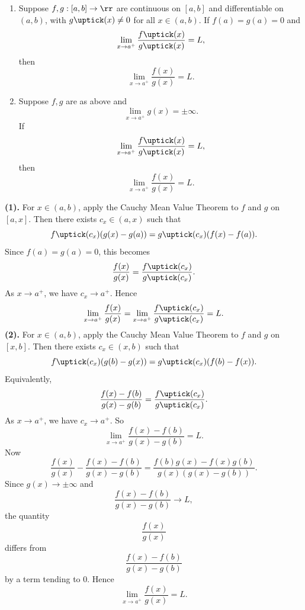 \begin{theorem}{
    \begin{enumerate}
        \item Suppose $f,g : [a,b]\to\rr$ are continuous on $[a,b]$ and differentiable on $(a,b)$, with $g\uptick(x)\neq 0$ for all $x\in(a,b)$.
        If $f(a) = g(a) = 0$ and
        \[
            \lim_{x\to a^+}\dfrac{f\uptick(x)}{g\uptick(x)} = L,
        \]
        then
        \[
            \lim_{x\to a^+}\dfrac{f(x)}{g(x)} = L.
        \]
        \item Suppose $f,g$ are as above and
        \[
            \lim_{x\to a^+} g(x) = \pm\infty.
        \]
        If
        \[
            \lim_{x\to a^+}\dfrac{f\uptick(x)}{g\uptick(x)} = L,
        \]
        then
        \[
            \lim_{x\to a^+}\dfrac{f(x)}{g(x)} = L.
        \]
    \end{enumerate}
}
	\textbf{(1).}
    For $x\in(a,b)$, apply the Cauchy Mean Value Theorem to $f$ and $g$ on $[a,x]$.
    Then there exists $c_x\in(a,x)$ such that
    \[
        f\uptick(c_x)(g(x)-g(a)) = g\uptick(c_x)(f(x)-f(a)).
    \]
    Since $f(a)=g(a)=0$, this becomes
    \[
        \dfrac{f(x)}{g(x)} = \dfrac{f\uptick(c_x)}{g\uptick(c_x)}.
    \]
    As $x\to a^+$, we have $c_x\to a^+$.
    Hence
    \[
        \lim_{x\to a^+}\dfrac{f(x)}{g(x)}
        =
        \lim_{x\to a^+}\dfrac{f\uptick(c_x)}{g\uptick(c_x)}
        =
        L.
    \]
    \textbf{(2).}
    For $x\in(a,b)$, apply the Cauchy Mean Value Theorem to $f$ and $g$ on $[x,b]$.
    Then there exists $c_x\in(x,b)$ such that
    \[
        f\uptick(c_x)(g(b)-g(x)) = g\uptick(c_x)(f(b)-f(x)).
    \]
    Equivalently,
    \[
        \dfrac{f(x)-f(b)}{g(x)-g(b)} = \dfrac{f\uptick(c_x)}{g\uptick(c_x)}.
    \]
    As $x\to a^+$, we have $c_x\to a^+$.
    So
    \[
        \lim_{x\to a^+}\dfrac{f(x)-f(b)}{g(x)-g(b)} = L.
    \]
    Now
    \[
        \dfrac{f(x)}{g(x)} - \dfrac{f(x)-f(b)}{g(x)-g(b)}
        =
        \dfrac{f(b)g(x) - f(x)g(b)}{g(x)(g(x)-g(b))}.
    \]
    Since $g(x)\to \pm\infty$ and
    \[
        \dfrac{f(x)-f(b)}{g(x)-g(b)} \to L,
    \]
    the quantity
    \[
        \dfrac{f(x)}{g(x)}
    \]
    differs from
    \[
        \dfrac{f(x)-f(b)}{g(x)-g(b)}
    \]
    by a term tending to $0$.
    Hence
    \[
        \lim_{x\to a^+}\dfrac{f(x)}{g(x)} = L.
    \]
\end{theorem}